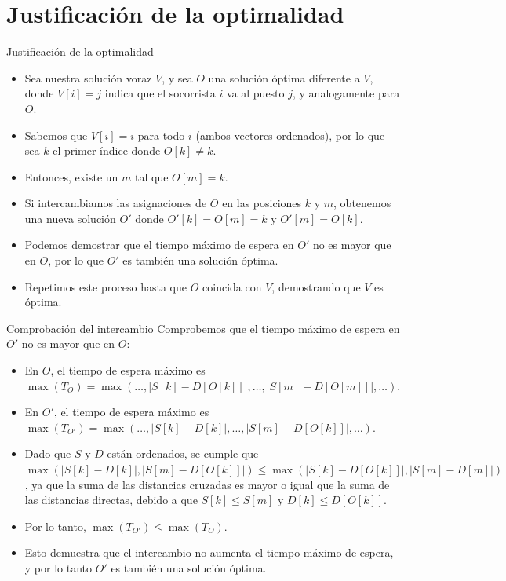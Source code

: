 \documentclass[aspectratio=169]{beamer}
\begin{document}
\section{Justificación de la optimalidad}
\begin{frame}{Justificación de la optimalidad}
    \begin{itemize}
        \item Sea nuestra solución voraz $V$, y sea $O$ una solución óptima diferente a $V$, donde $V[i] = j$ indica que el socorrista $i$ va al puesto $j$, y analogamente para $O$.
        \item Sabemos que $V[i] = i$ para todo $i$ (ambos vectores ordenados), por lo que sea $k$ el primer índice donde $O[k] \neq k$.
        \item Entonces, existe un $m$ tal que $O[m] = k$.
        \item Si intercambiamos las asignaciones de $O$ en las posiciones $k$ y $m$, obtenemos una nueva solución $O'$ donde $O'[k] = O[m] = k$ y $O'[m] = O[k]$.
        \item Podemos demostrar que el tiempo máximo de espera en $O'$ no es mayor que en $O$, por lo que $O'$ es también una solución óptima.
        \item Repetimos este proceso hasta que $O$ coincida con $V$, demostrando que $V$ es óptima.
    \end{itemize}
\end{frame}

\begin{frame}{Comprobación del intercambio}
    Comprobemos que el tiempo máximo de espera en $O'$ no es mayor que en $O$:
    \begin{itemize}
        \item En $O$, el tiempo de espera máximo es $\max(T_O) = \max(\ldots, |S[k] - D[O[k]]|, \ldots, |S[m] - D[O[m]]|, \ldots)$.
        \item En $O'$, el tiempo de espera máximo es $\max(T_{O'}) = \max(\ldots, |S[k] - D[k]|, \ldots, |S[m] - D[O[k]]|, \ldots)$.
        \item Dado que $S$ y $D$ están ordenados, se cumple que $\max (|S[k] - D[k]|, |S[m] - D[O[k]]|) \leq \max (|S[k] - D[O[k]]|, |S[m] - D[m]|)$, ya que la suma de las distancias cruzadas es mayor o igual que la suma de las distancias directas, debido a que $S[k] \leq S[m]$ y $D[k] \leq D[O[k]]$.
        \item Por lo tanto, $\max(T_{O'}) \leq \max(T_O)$.
        \item Esto demuestra que el intercambio no aumenta el tiempo máximo de espera, y por lo tanto $O'$ es también una solución óptima.
    \end{itemize}
\end{frame}
\end{document}
